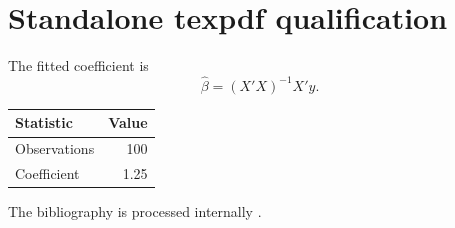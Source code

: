 \documentclass{article}
\begin{document}
\section*{Standalone texpdf qualification}
The fitted coefficient is
\[
  \widehat\beta=(X'X)^{-1}X'y.
\]
\begin{center}
\begin{tabular}{lr}
\toprule
Statistic & Value \\
\midrule
Observations & 100 \\
Coefficient & 1.25 \\
\bottomrule
\end{tabular}
\end{center}
The bibliography is processed internally \citep{smith2020}.


\end{document}
